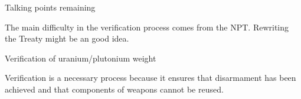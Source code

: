 \documentclass[twoside,titlepage,11pt,twocolumn,a4paper]{article}
\begin{document}
Talking points remaining

The main difficulty in the verification process comes from 
the NPT. Rewriting the Treaty might be an good idea. 
	
Verification of uranium/plutonium weight

Verification is a necessary process because it ensures that 
disarmament has been achieved and that components of weapons 
cannot be reused. 

\renewcommand{\refname}{\vspace*{-1.5em}\section{References}\vspace*{-1em}}


\end{document}
